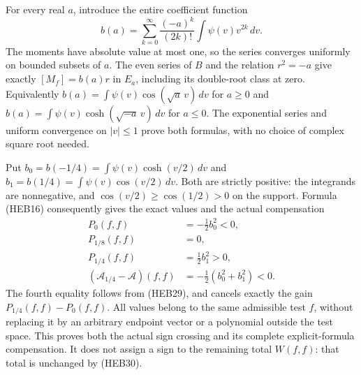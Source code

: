 \documentclass[
  10pt,
  a4paper,
]{article}
\begin{document}
For every real \(a\), introduce the entire coefficient function \[
b(a)=\sum_{k=0}^{\infty}\frac{(-a)^k}{(2k)!}\int\psi(v)v^{2k}\,dv.
\tag{HEB35}
\] The moments have absolute value at most one, so the series converges
uniformly on bounded subsets of \(a\). The even series of \(B\) and the
relation \(r^2=-a\) give exactly \([M_f]=b(a)r\) in \(E_a\), including
its double-root class at zero. Equivalently
\(b(a)=\int\psi(v)\cos(\sqrt a\,v)\,dv\) for \(a\ge0\) and
\(b(a)=\int\psi(v)\cosh(\sqrt{-a}\,v)\,dv\) for \(a\le0\). The
exponential series and uniform convergence on \(|v|\le1\) prove both
formulas, with no choice of complex square root needed.

Put \(b_0=b(-1/4)=\int\psi(v)\cosh(v/2)\,dv\) and
\(b_1=b(1/4)=\int\psi(v)\cos(v/2)\,dv\). Both are strictly positive: the
integrands are nonnegative, and \(\cos(v/2)\ge\cos(1/2)>0\) on the
support. Formula (HEB16) consequently gives the exact values and the
actual compensation \[
\begin{aligned}
P_0(f,f)&=-\tfrac12 b_0^2<0,\\
P_{1/8}(f,f)&=0,\\
P_{1/4}(f,f)&=\tfrac12 b_1^2>0,\\
(\mathcal A_{1/4}-\mathcal A)(f,f)
&=-\tfrac12(b_0^2+b_1^2)<0.
\end{aligned}
\tag{HEB36}
\] The fourth equality follows from (HEB29), and cancels exactly the
gain \(P_{1/4}(f,f)-P_0(f,f)\). All values belong to the same admissible
test \(f\), without replacing it by an arbitrary endpoint vector or a
polynomial outside the test space. This proves both the actual sign
crossing and its complete explicit-formula compensation. It does not
assign a sign to the remaining total \(W(f,f)\): that total is unchanged
by (HEB30).
\end{document}
